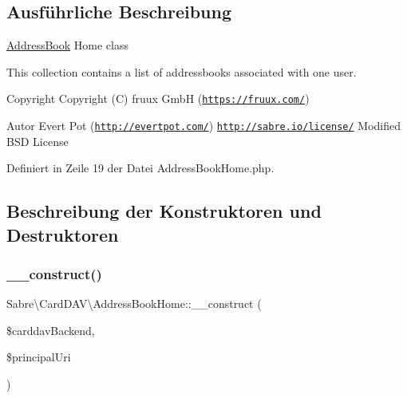 \subsection{Ausführliche Beschreibung}
\mbox{\hyperlink{class_sabre_1_1_card_d_a_v_1_1_address_book}{Address\+Book}} Home class

This collection contains a list of addressbooks associated with one user.

\begin{DoxyCopyright}{Copyright}
Copyright (C) fruux GmbH (\href{https://fruux.com/}{\tt https\+://fruux.\+com/}) 
\end{DoxyCopyright}
\begin{DoxyAuthor}{Autor}
Evert Pot (\href{http://evertpot.com/}{\tt http\+://evertpot.\+com/})  \href{http://sabre.io/license/}{\tt http\+://sabre.\+io/license/} Modified B\+SD License 
\end{DoxyAuthor}


Definiert in Zeile 19 der Datei Address\+Book\+Home.\+php.



\subsection{Beschreibung der Konstruktoren und Destruktoren}
\mbox{\label{class_sabre_1_1_card_d_a_v_1_1_address_book_home_ae7959dbbbd1acc202ab6996a8ab46f19}} 
\subsubsection{\texorpdfstring{\+\_\+\+\_\+construct()}{\_\_construct()}}
{\footnotesize\ttfamily Sabre\textbackslash{}\+Card\+D\+A\+V\textbackslash{}\+Address\+Book\+Home\+::\+\_\+\+\_\+construct (\begin{DoxyParamCaption}\item[{\mbox{\hyperlink{interface_sabre_1_1_card_d_a_v_1_1_backend_1_1_backend_interface}{Backend\textbackslash{}\+Backend\+Interface}}}]{\$carddav\+Backend,  }\item[{}]{\$principal\+Uri }\end{DoxyParamCaption})}

